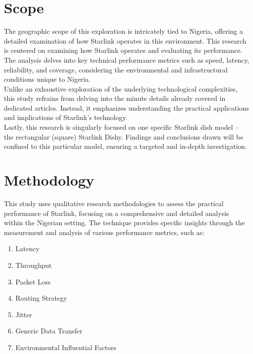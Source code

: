 \section{Scope}
The geographic scope of this exploration is intricately tied to Nigeria, offering a detailed examination of how Starlink operates in this environment. This research is centered on examining how Starlink operates and evaluating its performance. \\
The analysis delves into key technical performance metrics such as speed, latency, reliability, and coverage, considering the environmental and infrastructural conditions unique to Nigeria.\\
Unlike an exhaustive exploration of the underlying technological complexities, this study refrains from delving into the minute details already covered in dedicated articles. Instead, it emphasizes understanding the practical applications and implications of Starlink's technology.\\
Lastly, this research is singularly focused on one specific Starlink dish model – the rectangular (square) Starlink Dishy. Findings and conclusions drawn will be confined to this particular model, ensuring a targeted and in-depth investigation.\\
\section{Methodology}
This study uses qualitative research methodologies to assess the practical performance of Starlink, focusing on a comprehensive and detailed analysis within the Nigerian setting. The technique provides specific insights through the measurement and analysis of various performance metrics, such as:
\begin{enumerate}
\item Latency
\item Throughput
\item Packet Loss
\item Routing Strategy
\item Jitter
\item Generic Data Transfer
\item Environmental Influential Factors
\end{enumerate}
